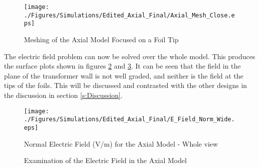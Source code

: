 \begin{figure}[!h]
  \centering
    \texttt{[image: ./Figures/Simulations/Edited\_Axial\_Final/Axial\_Mesh\_Close.eps]} 
	\caption{Meshing of the Axial Model Focused on a Foil Tip}
	\label{Figure:Axial_Mesh_close}
\end{figure}

The electric field problem can now be solved over the whole model.
This produces the surface plots shown in figures \ref{Figure:Radial_Field_Wide} and \ref{Figure:No_Grading_Field}.
It can be seen that the field in the plane of the transformer wall is not well graded, and neither is the field at the tips of the foils.
This will be discussed and contrasted with the other designs in the discussion in section \ref{s:Discussion}.

\begin{figure}[!h]
  \centering
    \texttt{[image: ./Figures/Simulations/Edited\_Axial\_Final/E\_Field\_Norm\_Wide.eps]} 
	\caption{Normal Electric Field (V/m) for the Axial Model - Whole view}
	\label{Figure:Radial_Field_Wide}
   \end{figure}

\begin{figure}[!h]
  \centering
{} 
\caption{Examination of the Electric Field in the Axial Model}
\label{Figure:No_Grading_Field}
\end{figure}


